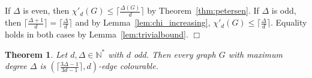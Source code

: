\documentclass[11pt]{article}
\newtheorem{theorem}[lemma]{Theorem}
\newcounter{claim}
\newenvironment{proof}[1][]%
 {\noindent {\setcounter{claim}{0}\sc proof ---
   }{#1}{}}{\hfill$\Box$\vspace{2ex}}
\begin{document}
\begin{proof}
If $\Delta$ is even, then $\chi'_d(G) \leq \lceil \frac{\Delta(G)}{d} \rceil$ by Theorem~\ref{thm:petersen}. 
If $\Delta$ is odd, then 
$\lceil \frac{\Delta+1}{d} \rceil = \lceil \frac{\Delta}{d} \rceil $  
and by Lemma~\ref{lem:chi_increasing}, 
$\chi'_d(G) \leq  \lceil \frac{\Delta}{d} \rceil$.
Equality holds in both cases by Lemma~\ref{lem:trivialbound}.  
\end{proof}

\begin{theorem}
Let $d, \Delta \in \mathbb N^*$ with $d$ odd. 
Then every graph $G$ with maximum degree $\Delta$ is $(\lceil \frac{3\Delta - 1}{3d - 1} \rceil, d)$-edge colourable. 
\end{theorem}
\end{document}
